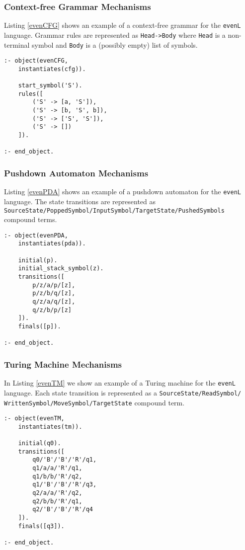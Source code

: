 \documentclass{llncs}
\begin{document}
\subsubsection{Context-free Grammar Mechanisms}
Listing \ref{evenCFG} shows an example of a context-free grammar for the \lstinline{evenL} language. Grammar rules are represented as \lstinline{Head->Body} where \lstinline{Head} is a non-terminal symbol and \lstinline{Body} is a (possibly empty) list of symbols.
\begin{lstlisting}[caption={Context-free grammar for the \lstinline{evenL} language}, label=evenCFG]
:- object(evenCFG,
    instantiates(cfg)).

    start_symbol('S').
    rules([
        ('S' -> [a, 'S']),
        ('S' -> [b, 'S', b]),
        ('S' -> ['S', 'S']),
        ('S' -> [])
    ]).

:- end_object.
\end{lstlisting}


\subsubsection{Pushdown Automaton Mechanisms}
Listing \ref{evenPDA} shows an example of a pushdown automaton for the \lstinline{evenL} language. The state transitions are represented as \lstinline{SourceState/PoppedSymbol/InputSymbol/TargetState/PushedSymbols} compound terms.

\begin{lstlisting}[caption={Pushdown automaton for the \lstinline{evenL} language}, label=evenPDA]
:- object(evenPDA,
    instantiates(pda)).

    initial(p).
    initial_stack_symbol(z).
    transitions([
        p/z/a/p/[z],
        p/z/b/q/[z],
        q/z/a/q/[z],
        q/z/b/p/[z]
    ]).
    finals([p]).

:- end_object.
\end{lstlisting}


\subsubsection{Turing Machine Mechanisms}

In Listing \ref{evenTM} we show an example of a Turing machine for the \lstinline{evenL} language. Each state transition is represented as a \lstinline{SourceState/ReadSymbol/} \lstinline{WrittenSymbol/MoveSymbol/TargetState} compound term.

\begin{lstlisting}[caption={Turing machine for the \lstinline{evenL} language}, label=evenTM]
:- object(evenTM,
    instantiates(tm)).

    initial(q0).
    transitions([
        q0/'B'/'B'/'R'/q1,
        q1/a/a/'R'/q1,
        q1/b/b/'R'/q2,
        q1/'B'/'B'/'R'/q3,
        q2/a/a/'R'/q2,
        q2/b/b/'R'/q1,
        q2/'B'/'B'/'R'/q4
    ]).
    finals([q3]).

:- end_object.
\end{lstlisting}
\end{document}
